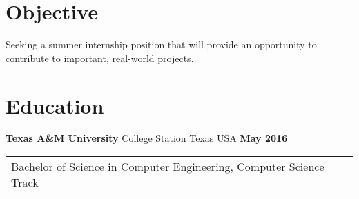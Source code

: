 \vspace*{.1in}
{\color{Black}
\begin{resume}

{\color{Black}
  \section{\sc Objective}}
Seeking a summer internship position that will provide an opportunity to
contribute to important, real-world projects.

\color{black}
{\color{Black}
  \vspace{-.1in}
  \section{\sc Education}}

{\bf Texas A\&M University} College Station Texas USA \hfill {\bf May 2016} \ \\
\vspace*{-.17in}
\begin{tabular}{l l l}
  Bachelor of Science in Computer Engineering, Computer Science Track \\
\end{tabular}


\end{resume}}
